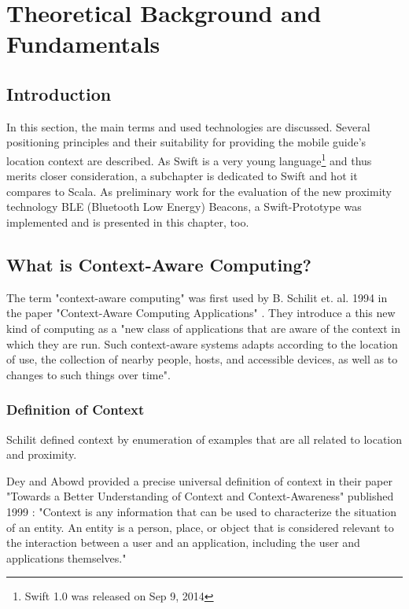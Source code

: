 \chapter{Theoretical Background and Fundamentals}


\section{Introduction}

In this section, the main terms and used technologies are discussed. Several positioning principles and their suitability for providing the mobile guide's location context are described. As Swift is a very young language\footnote{Swift 1.0 was released on Sep 9, 2014} and thus merits closer consideration, a subchapter is dedicated to Swift and hot it compares to Scala. As preliminary work for the evaluation of the new proximity technology BLE (Bluetooth Low Energy) Beacons, a Swift-Prototype was implemented and is presented in this chapter, too.

\section{What is Context-Aware Computing?}

The term "context-aware computing" was first used by B. Schilit et. al. 1994 in the paper "Context-Aware Computing Applications" \cite{Schilit94context-awarecomputing}. They introduce a this new kind of computing as a "new class of applications that are aware of the context in which they are run. Such context-aware systems adapts according to the location of use, the collection of nearby people, hosts, and accessible devices, as well as to changes to such things over time".

\subsection{Definition of Context}

Schilit defined context by enumeration of examples that are all related to location and proximity.

Dey and Abowd provided a precise universal definition of context in their paper "Towards a Better Understanding of Context and Context-Awareness" published 1999 \cite{Abowd99}: "Context is any information that can be used to characterize the situation of an entity. An entity is a person, place, or object that is considered relevant to the interaction between a user and an application, including the user and applications themselves."

